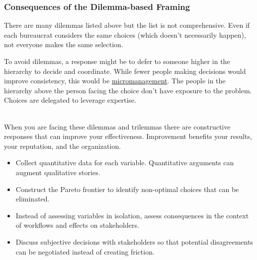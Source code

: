 



\subsubsection{Consequences of the Dilemma-based Framing}

There are many dilemmas listed above but the list is not comprehensive. Even if each bureaucrat considers the same choices (which doesn't necessarily happen), not everyone makes the same selection. 

To avoid dilemmas, a response might be to defer to someone higher in the hierarchy to decide and coordinate. While fewer people making decisions would improve consistency, this would be \href{https://en.wikipedia.org/wiki/Micromanagement}{micromanagement}. 
The people in the hierarchy above the person facing the choice don't have exposure to the problem. Choices are delegated to leverage expertise. 

\ \\

When you are facing these dilemmas and trilemmas
there are constructive responses that can improve your effectiveness. Improvement benefits your results, your reputation, and the organization. 
\begin{itemize}
    \item Collect quantitative data for each variable. Quantitative arguments can augment qualitative stories. 
    \item Construct the Pareto frontier to identify non-optimal choices that can be eliminated.
    \item Instead of assessing variables in isolation, assess consequences in the context of workflows and effects on stakeholders.
    \item Discuss subjective decisions with stakeholders so that potential disagreements can be negotiated instead of creating friction.
\end{itemize}
 

